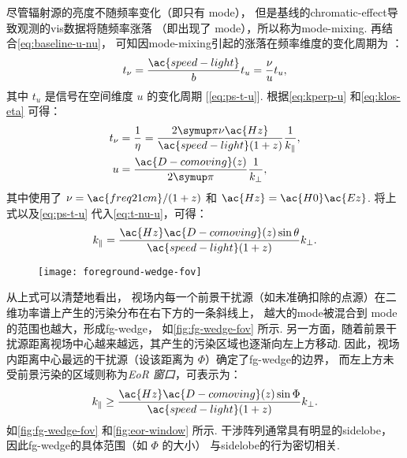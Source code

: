 尽管辐射源的亮度不随频率变化（即只有 \kperp{} \ac{mode}），
但是基线的\ac{chromatic-effect}导致观测的\ac{vis}数据将随频率涨落
（即出现了 \klos{} \ac{mode}），所以称为\ac{mode-mixing}.
再结合\autoref{eq:baseline-u-nu}，
可知因\ac{mode-mixing}引起的涨落在频率维度的变化周期为 \cite{morales2012}：
\begin{equation}
  \label{eq:t-nu-u}
  t_{\nu} = \frac{\ac{speed-light}}{b} t_u
    = \frac{\nu}{u} t_u ,
\end{equation}
其中 $t_u$ 是信号在空间维度 $u$ 的变化周期 [\autoref{eq:ps-t-u}].
根据\autoref{eq:kperp-u} 和\autoref{eq:klos-eta} 可得：
\begin{align}
  t_{\nu} & = \frac{1}{\eta}
    = \frac{2\Cpi \nu \ac{Hz}}{\ac{speed-light} (1+z)} \frac{1}{\klos} , \\
  u & = \frac{\ac{D-comoving}(z)}{2\Cpi} \frac{1}{\kperp} ,
\end{align}
其中使用了 $\nu = \ac{freq21cm} / (1+z)$ 和 $\ac{Hz} = \ac{H0} \ac{Ez}$.
将上式以及\autoref{eq:ps-t-u} 代入\autoref{eq:t-nu-u}，可得：
\begin{equation}
  \label{eq:klos-kperp}
  \klos = \frac{\ac{Hz} \ac{D-comoving}(z) \sin\theta}{
    \ac{speed-light} (1+z)} \kperp .
\end{equation}

\begin{figure}[htp]
  \centering
  \texttt{[image: foreground-wedge-fov]}
  \label{fig:fg-wedge-fov}
\end{figure}

从上式可以清楚地看出，
视场内每一个前景干扰源（如未准确扣除的点源）在二维功率谱上产生的污染分布在右下方的一条斜线上，
\kperp{} 越大的\ac{mode}被混合到 \klos{} \ac{mode}的范围也越大，形成\ac{fg-wedge}，
如\autoref{fig:fg-wedge-fov} 所示.
另一方面，随着前景干扰源距离视场中心越来越远，其产生的污染区域也逐渐向左上方移动.
因此，视场内距离中心最远的干扰源（设该距离为 $\Phi$）确定了\ac{fg-wedge}的边界，
而左上方未受前景污染的区域则称为\emph{EoR 窗口}，可表示为：
\begin{equation}
  \klos \ge \frac{\ac{Hz} \ac{D-comoving}(z) \sin\Phi}{
    \ac{speed-light} (1+z)} \kperp .
\end{equation}
如\autoref{fig:fg-wedge-fov} 和\autoref{fig:eor-window} 所示.
干涉阵列通常具有明显的\ac{sidelobe}，
因此\ac{fg-wedge}的具体范围（如 $\Phi$ 的大小）
与\ac{sidelobe}的行为密切相关.

